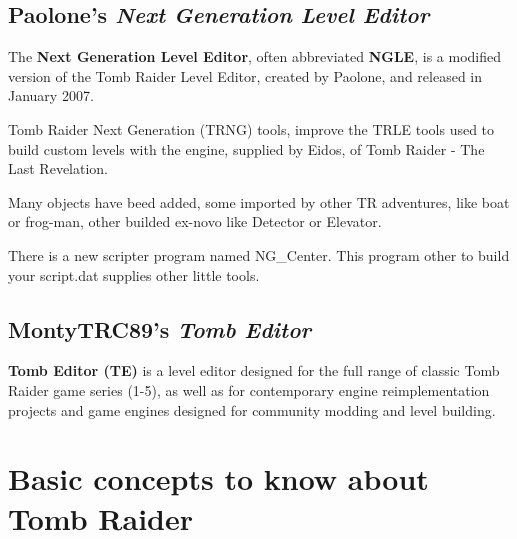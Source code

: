 \section{Paolone's \emph{Next Generation Level Editor}  }
The \textbf{Next Generation Level Editor}, often abbreviated \textbf{NGLE}, is a modified version of the Tomb Raider Level Editor, created by Paolone, and released in January 2007. \cite{wikiraider_NGLE}
\par Tomb Raider Next Generation  (TRNG)  tools, improve the TRLE tools used to build custom levels with the engine, supplied by Eidos, of Tomb Raider - The Last Revelation.
\par Many objects have beed added, some imported by other TR adventures, like boat or frog-man, other builded ex-novo like Detector or Elevator.
\par There is a new scripter program named NG\_Center. This program other to build your script.dat supplies other little tools. \cite{paolone_trng}
\section{MontyTRC89's \emph{Tomb Editor}}
\textbf{Tomb Editor (TE)} is a level editor designed for the full range of classic Tomb Raider game series (1-5), as well as for contemporary engine reimplementation projects and game engines designed for community modding and level building. \cite{TE_github}

\chapter{Basic concepts to know about Tomb Raider}
